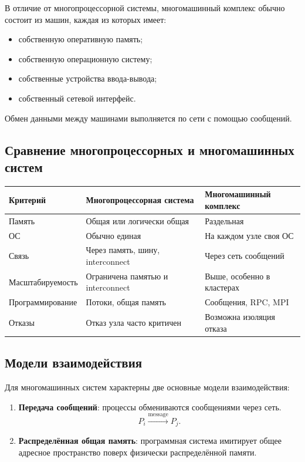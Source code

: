 \documentclass[12pt,a4paper]{article}
\begin{document}
В отличие от многопроцессорной системы, многомашинный комплекс обычно состоит из машин, каждая из которых имеет:
\begin{itemize}
    \item собственную оперативную память;
    \item собственную операционную систему;
    \item собственные устройства ввода-вывода;
    \item собственный сетевой интерфейс.
\end{itemize}

Обмен данными между машинами выполняется по сети с помощью сообщений.

\subsection{Сравнение многопроцессорных и многомашинных систем}

\begin{center}
\begin{tabular}{p{4cm}p{5cm}p{5cm}}
\toprule
Критерий & Многопроцессорная система & Многомашинный комплекс \\
\midrule
Память & Общая или логически общая & Раздельная \\
ОС & Обычно единая & На каждом узле своя ОС \\
Связь & Через память, шину, interconnect & Через сеть сообщений \\
Масштабируемость & Ограничена памятью и interconnect & Выше, особенно в кластерах \\
Программирование & Потоки, общая память & Сообщения, RPC, MPI \\
Отказы & Отказ узла часто критичен & Возможна изоляция отказа \\
\bottomrule
\end{tabular}
\end{center}

\subsection{Модели взаимодействия}

Для многомашинных систем характерны две основные модели взаимодействия:

\begin{enumerate}
    \item \textbf{Передача сообщений}: процессы обмениваются сообщениями через сеть.
    \[
    P_i \xrightarrow{\text{message}} P_j.
    \]

    \item \textbf{Распределённая общая память}: программная система имитирует общее адресное пространство поверх физически распределённой памяти.
\end{enumerate}
\end{document}
